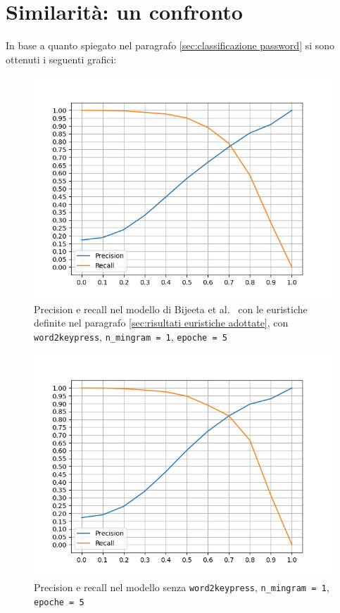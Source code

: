\section{Similarità: un confronto}
\label{sec:similarita, confronto tra modelli}
In base a quanto spiegato nel paragrafo \ref{sec:classificazione password} si sono ottenuti i seguenti grafici:
\begin{figure}[H]
    \centering
    \includegraphics[width=14cm]{./immagini/CORRETTO_w2kp_nmingram=1_epochs=5.png}
    \caption{Precision e recall nel modello di Bijeeta et al.~\cite{bijeeta} con le euristiche definite nel paragrafo \ref{sec:risultati euristiche adottate}, con \texttt{word2keypress}, \texttt{n\_mingram = 1}, \texttt{epoche = 5}}
    \label{primomodello}
\end{figure}
\begin{figure}[H]
    \centering
    \includegraphics[width=14cm]{./immagini/no_w2kp_nmingram=1_epochs=5.png}
    \caption{Precision e recall nel modello senza \texttt{word2keypress}, \texttt{n\_mingram = 1}, \texttt{epoche = 5}}
    \label{secondomodello}
\end{figure}

